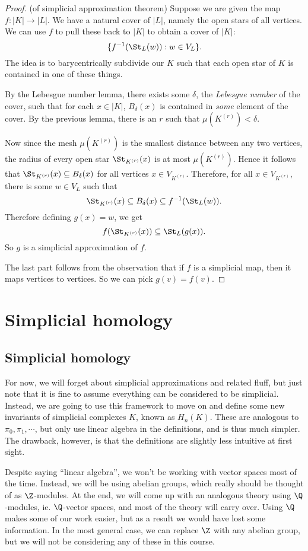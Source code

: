 \documentclass[a4paper]{article}
\begin{document}
\begin{proof}(of simplicial approximation theorem)
  Suppose we are given the map $f: |K| \to |L|$. We have a natural cover of $|L|$, namely the open stars of all vertices. We can use $f$ to pull these back to $|K|$ to obtain a cover of $|K|$:
  \[
    \{f^{-1}(\St_L(w)) : w \in V_L\}.
  \]
  The idea is to barycentrically subdivide our $K$ such that each open star of $K$ is contained in one of these things.

  By the Lebesgue number lemma, there exists some $\delta$, the \emph{Lebesgue number} of the cover, such that for each $x \in |K|$, $B_\delta(x)$ is contained in \emph{some} element of the cover. By the previous lemma, there is an $r$ such that $\mu(K^{(r)}) < \delta$.

  Now since the mesh $\mu(K^{(r)})$ is the smallest distance between any two vertices, the radius of every open star $\St_{K^{(r)}}(x)$ is at most $\mu(K^{(r)})$. Hence it follows that $\St_{K^{(r)}}(x) \subseteq B_\delta(x)$ for all vertices $x \in V_{K^{(r)}}$. Therefore, for all $x \in V_{K^{(r)}}$, there is some $w \in V_L$ such that
  \[
    \St_{K^{(r)}}(x) \subseteq B_\delta(x) \subseteq f^{-1}(\St_L(w)).
  \]
  Therefore defining $g(x) = w$, we get
  \[
    f(\St_{K^{(r)}}(x)) \subseteq \St_L(g(x)).
  \]
  So $g$ is a simplicial approximation of $f$.

  The last part follows from the observation that if $f$ is a simplicial map, then it maps vertices to vertices. So we can pick $g(v) = f(v)$.
\end{proof}

\section{Simplicial homology}
\subsection{Simplicial homology}
For now, we will forget about simplicial approximations and related fluff, but just note that it is fine to assume everything can be considered to be simplicial. Instead, we are going to use this framework to move on and define some new invariants of simplicial complexes $K$, known as $H_n(K)$. These are analogous to $\pi_0, \pi_1, \cdots$, but only use linear algebra in the definitions, and is thus much simpler. The drawback, however, is that the definitions are slightly less intuitive at first sight.

Despite saying ``linear algebra'', we won't be working with vector spaces most of the time. Instead, we will be using abelian groups, which really should be thought of as $\Z$-modules. At the end, we will come up with an analogous theory using $\Q$-modules, ie. $\Q$-vector spaces, and most of the theory will carry over. Using $\Q$ makes some of our work easier, but as a result we would have lost some information. In the most general case, we can replace $\Z$ with any abelian group, but we will not be considering any of these in this course.
\end{document}

